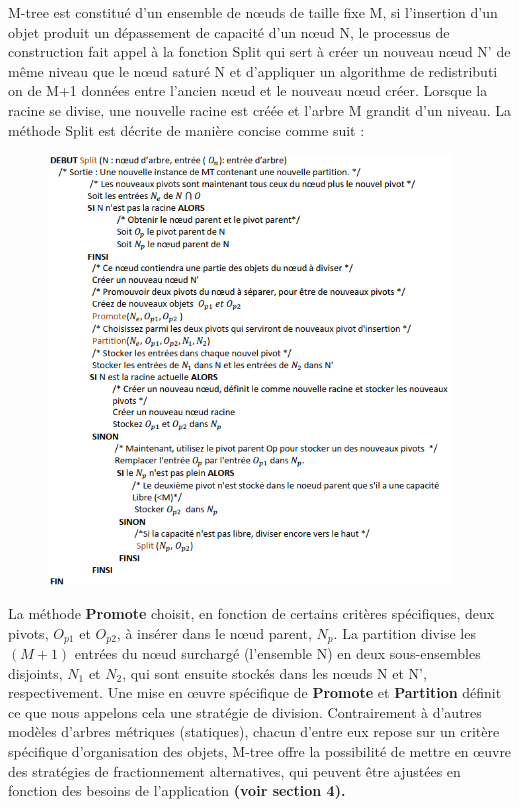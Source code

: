 M-tree est constitué d’un ensemble de nœuds de taille fixe M, si l'insertion d'un objet produit un dépassement de capacité d'un nœud N, le processus de construction fait appel à la fonction Split qui sert à créer un nouveau nœud N' de même niveau que le nœud saturé N et d’appliquer un algorithme de redistributi on de M+1 données entre l’ancien nœud et le nouveau nœud créer. Lorsque la racine se divise, une nouvelle racine est créée et l'arbre M grandit d'un niveau. La méthode Split est décrite de manière concise comme suit :\\

\begin{figure}[H]
	\centering
	\includegraphics[width=0.95\textwidth]{Figures/split.png} %
	
\end{figure}


La méthode \textbf{Promote} choisit, en fonction de certains critères spécifiques, deux pivots, $ O_{p1} $ et $  O_{p2} $, à insérer dans le nœud parent, $ N_p $. La partition divise les $ (M + 1) $ entrées du nœud surchargé (l'ensemble N) en deux sous-ensembles disjoints, $ N_1 $ et $ N_2 $, qui sont ensuite stockés dans les nœuds N et N', respectivement. Une mise en œuvre spécifique de \textbf{Promote} et \textbf{Partition} définit ce que nous appelons cela une stratégie de division. Contrairement à d'autres modèles d'arbres métriques (statiques), chacun d'entre eux repose sur un critère spécifique d'organisation des objets, M-tree offre la possibilité de mettre en œuvre des stratégies de fractionnement alternatives, qui peuvent être ajustées en fonction des besoins de l'application \textbf{(voir section 4).}\\

